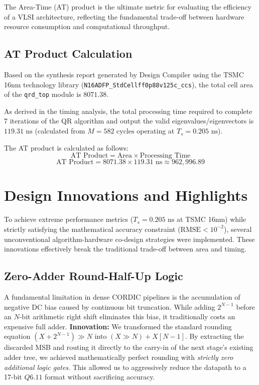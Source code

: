 \documentclass[11pt, a4paper]{article}
\begin{document}
The Area-Time (AT) product is the ultimate metric for evaluating the efficiency of a VLSI architecture, reflecting the fundamental trade-off between hardware resource consumption and computational throughput. 

\subsection{AT Product Calculation}
Based on the synthesis report generated by Design Compiler using the TSMC 16nm technology library (\texttt{N16ADFP\_StdCellff0p88v125c\_ccs}), the total cell area of the \texttt{qrd\_top} module is $8071.38$. 

As derived in the timing analysis, the total processing time required to complete 7 iterations of the QR algorithm and output the valid eigenvalues/eigenvectors is $119.31 \text{ ns}$ (calculated from $M = 582 \text{ cycles}$ operating at $T_s = 0.205 \text{ ns}$). 

The AT product is calculated as follows:
$$ \text{AT Product} = \text{Area} \times \text{Processing Time} $$
$$ \text{AT Product} = 8071.38 \times 119.31 \text{ ns} \approx 962,996.89 $$

\section{Design Innovations and Highlights}

To achieve extreme performance metrics ($T_s = 0.205 \text{ ns}$ at TSMC 16nm) while strictly satisfying the mathematical accuracy constraint ($\text{RMSE} < 10^{-2}$), several unconventional algorithm-hardware co-design strategies were implemented. These innovations effectively break the traditional trade-off between area and timing.

\subsection{Zero-Adder Round-Half-Up Logic}
A fundamental limitation in dense CORDIC pipelines is the accumulation of negative DC bias caused by continuous bit truncation. While adding $2^{N-1}$ before an $N$-bit arithmetic right shift eliminates this bias, it traditionally costs an expensive full adder. 
\textbf{Innovation:} We transformed the standard rounding equation $(X + 2^{N-1}) \gg N$ into $(X \gg N) + X[N-1]$. By extracting the discarded MSB and routing it directly to the carry-in of the next stage's existing adder tree, we achieved mathematically perfect rounding with \textit{strictly zero additional logic gates}. This allowed us to aggressively reduce the datapath to a 17-bit $Q6.11$ format without sacrificing accuracy.
\end{document}
